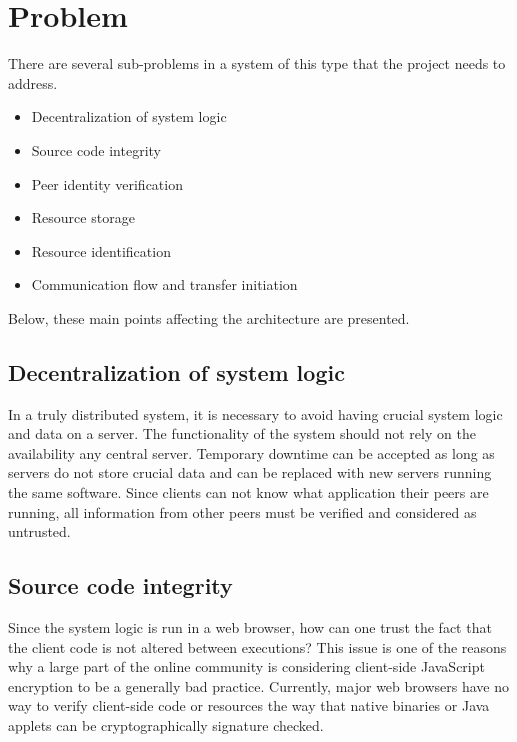 \section{Problem}
\label{sec:problem}


There are several sub-problems in a system of this type that the project needs to address.

\begin{itemize}
\item Decentralization of system logic
\item Source code integrity
\item Peer identity verification
\item Resource storage
\item Resource identification
\item Communication flow and transfer initiation
\end{itemize}

Below, these main points affecting the architecture are presented.

\subsection{Decentralization of system logic}
In a truly distributed system, it is necessary to avoid having crucial system logic and data on a server. The functionality of the system should not rely on the availability any central server. Temporary downtime can be accepted as long as servers do not store crucial data and can be replaced with new servers running the same software. Since clients can not know what application their peers are running, all information from other peers must be verified and considered as untrusted.

\subsection{Source code integrity}
Since the system logic is run in a web browser, how can one trust the fact that the client code is not altered between executions? This issue is one of the reasons why a large part of the online community is considering client-side JavaScript encryption to be a generally bad practice. Currently, major web browsers have no way to verify client-side code or resources the way that native binaries or Java applets can be cryptographically signature checked.

